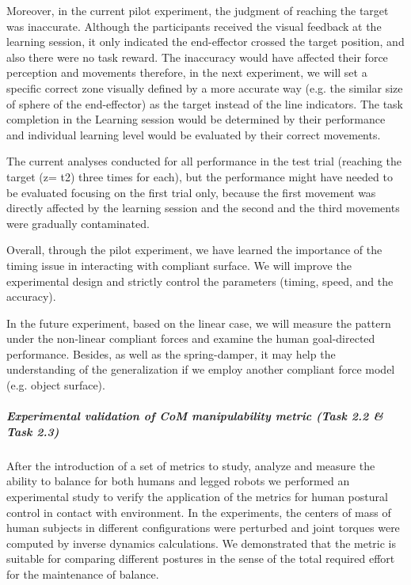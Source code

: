 Moreover, in the current pilot experiment, the judgment of reaching the target
was inaccurate. Although the participants received the visual feedback at the
learning session, it only indicated the end-effector crossed the target
position, and also there were no task reward. The inaccuracy would have
affected their force perception and movements \cite{Rank&DiLuca15} therefore,
in the next experiment, we will set a specific correct zone visually defined
by a more accurate way (e.g. the similar size of sphere of the end-effector)
as the target instead of the line indicators. The task completion in the
Learning session would be determined by their performance and individual
learning level would be evaluated by their correct movements.

The current analyses conducted for all performance in the test trial (reaching 
the target (z= t2) three times for each), but the performance might have needed 
to be evaluated focusing on the first trial only, because the first movement 
was directly affected by the learning session and the second and the third 
movements were gradually contaminated.

Overall, through the pilot experiment, we have learned the importance of the 
timing issue in interacting with compliant surface. We will improve the 
experimental design and strictly control the parameters (timing, speed, 
and the accuracy). 

In the future experiment, based on the linear case, we will measure the 
pattern under the non-linear compliant forces and examine the human 
goal-directed performance. Besides, as well as the spring-damper, it may 
help the understanding of the generalization if we employ another compliant 
force model (e.g. object surface).



\subparagraph{Experimental validation of CoM manipulability metric (Task 2.2 & Task 2.3)}

\newcommand{\BW}{\mathbf{W}}
\newcommand{\Bc}{\mathbf{c}}

After the introduction of a set of metrics to study, analyze and measure the ability to balance for both humans and legged robots we performed an experimental study to verify the application of the metrics for human postural control in contact with environment.  In the
experiments, the centers of mass of human subjects in different configurations were perturbed and joint torques were computed by inverse dynamics calculations.  We demonstrated that the metric is suitable for comparing different postures in the sense of the total required effort for the maintenance of balance.


